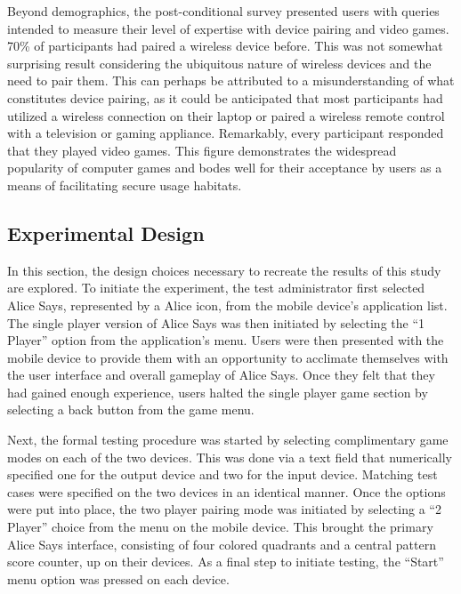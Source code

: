 Beyond demographics, the post-conditional survey presented users with queries
intended to measure their level of expertise with device pairing and video
games. 70\% of participants had paired a wireless device before. This was not
somewhat surprising result considering the ubiquitous nature of wireless
devices and the need to pair them. This can perhaps be attributed to a
misunderstanding of what constitutes device pairing, as it could be anticipated
that most participants had utilized a wireless connection on their laptop or
paired a wireless remote control with a television or gaming appliance.
Remarkably, every participant responded that they played video games. This
figure demonstrates the widespread popularity of computer games and bodes well
for their acceptance by users as a means of facilitating secure usage habitats. 

\subsection{Experimental Design}


In this section, the design choices necessary to recreate the results of this
study are explored. To initiate the experiment, the test administrator first
selected Alice Says, represented by a Alice icon, from the mobile device's
application list. The single player version of Alice Says was then initiated by
selecting the ``1 Player'' option from the application's menu. Users were then
presented with the mobile device to provide them with an opportunity to
acclimate themselves with the user interface and overall gameplay of Alice
Says. 
Once
they felt that they had gained enough experience, users halted the single
player game section by selecting a back button from the game menu.

Next, the formal testing procedure was started by selecting complimentary game
modes on each of the two devices. This was done via a text field that
numerically specified one for the output device and two for the input device.
Matching test cases were specified on the two devices in an identical manner.
Once the options were put into place, the two player pairing mode was initiated
by selecting a ``2 Player'' choice from the menu on the mobile device. This
brought the primary Alice Says interface, consisting of four colored quadrants
and a central pattern score counter, up on their devices. As a final step to
initiate testing, the ``Start'' menu option was pressed on each device.


